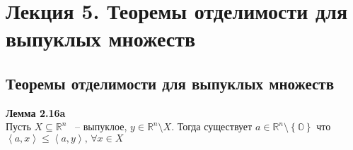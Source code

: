 \section{Лекция 5. Теоремы отделимости для выпуклых множеств}
\subsection{Теоремы отделимости для выпуклых множеств}

\noindent\textbf{Лемма 2.16a}\\

Пусть $X\subseteq \mathbb{R}^n$ ~-- выпуклое, $y \in \mathbb{R}^{n} \setminus X$. Тогда существует $a \in \mathbb{R}^{n} \setminus \left\lbrace\mathbb{O}\right\rbrace$ что $\left\langle a,x \right\rangle \leq \left\langle a,y \right\rangle \text{, } \forall x \in X$\\

